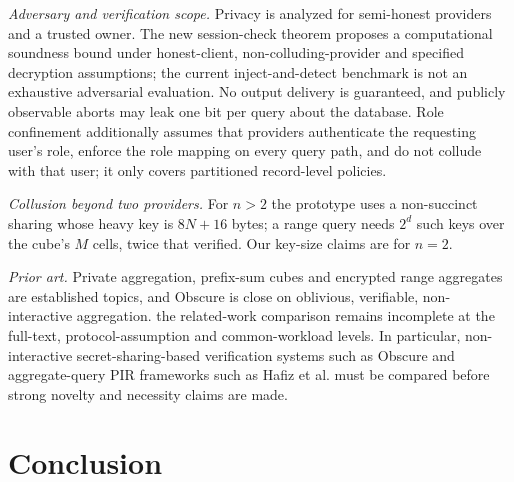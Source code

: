 \documentclass[a4paper,fleqn]{cas-sc}
\begin{document}
\emph{Adversary and verification scope.} Privacy is analyzed for
semi-honest providers and a trusted owner. The new session-check theorem
proposes a computational soundness bound under honest-client,
non-colluding-provider and specified decryption assumptions; the current
inject-and-detect benchmark is not an exhaustive adversarial evaluation.
No output delivery is guaranteed, and publicly observable aborts may leak
one bit per query about the database. Role confinement additionally assumes
that providers authenticate the requesting user's role, enforce the role
mapping on every query path, and do not collude with that user; it only
covers partitioned record-level policies.

\emph{Collusion beyond two providers.} For $n>2$ the prototype uses a
non-succinct sharing whose heavy key is $8N+16$ bytes; a range query needs
$2^d$ such keys over the cube's $M$ cells, twice that verified. Our key-size
claims are for $n=2$.

\emph{Prior art.} Private aggregation, prefix-sum cubes and encrypted range
aggregates are established topics, and Obscure is close on oblivious,
verifiable, non-interactive aggregation. the related-work comparison remains incomplete at the full-text,
protocol-assumption and common-workload levels. In particular,
non-interactive secret-sharing-based verification systems such as Obscure
and aggregate-query PIR frameworks such as Hafiz et al. must be
compared before strong novelty and necessity claims are made.

\section{Conclusion}
\label{sec:conclusion}
\end{document}
